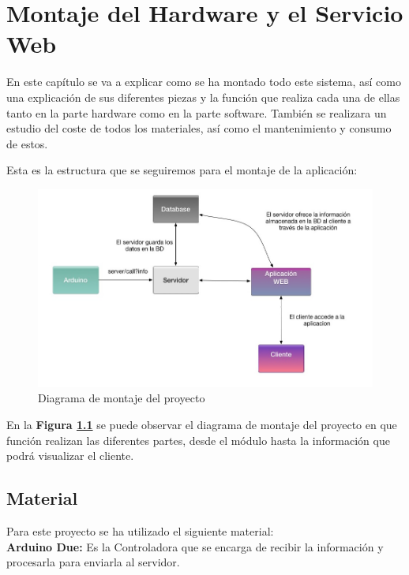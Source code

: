 
\chapter{Montaje del Hardware y el Servicio Web}

\setlength{\parindent}{5ex}En este capítulo se va a explicar como se ha montado todo este sistema, así como una explicación de sus diferentes piezas y la función que realiza cada una de ellas tanto en la parte hardware como en la parte software.
También se realizara un estudio del coste de todos los materiales, así como el mantenimiento y consumo de estos.

\setlength{\parindent}{0ex}Esta es la estructura que se seguiremos para el montaje de la aplicación:

\begin{figure}[!h]
	\centering
	\includegraphics[width=1.0\linewidth]{figuras/montage1}
	\caption{Diagrama de montaje del proyecto}
	\label{fig:imgmontage1}
\end{figure}

En la \textbf{Figura \ref{fig:imgmontage1}} se puede observar el diagrama de montaje del proyecto en que función realizan las diferentes partes, desde el módulo hasta la información que podrá visualizar el cliente.
\clearpage

\section{Material}

\setlength{\parindent}{0ex}Para este proyecto se ha utilizado el siguiente material:\\

\textbf{Arduino Due:} Es la Controladora que se encarga de recibir la información y procesarla para enviarla al servidor.

